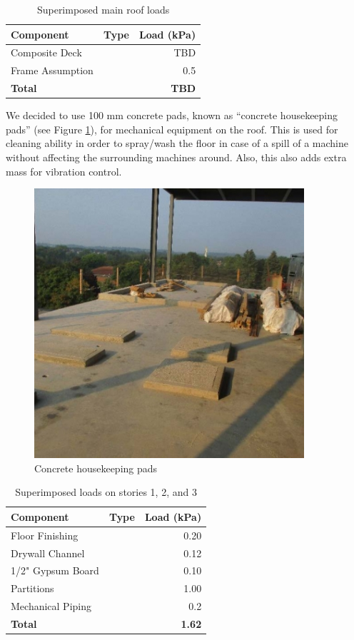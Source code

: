 \documentclass[12pt]{article}
\begin{document}
\begin{table}[h!]
    \centering
    \caption{Superimposed main roof loads}
    \label{tab:selfMain}
    \begin{tabular}{lcr}
        \toprule
        \textbf{Component} & \textbf{Type} & \textbf{Load (kPa)}\\
        \midrule
        Composite Deck &  & TBD\\
        Frame Assumption &  & 0.5\\
        \textbf{Total} & & \textbf{TBD}\\
        \bottomrule
    \end{tabular}
\end{table}

We decided to use 100 mm concrete pads, known as “concrete housekeeping pads” (see Figure \ref{fig:Housekeeping_Pads}), for mechanical equipment on the roof.
This is used for cleaning ability in order to spray/wash the floor in case of a spill of a machine without affecting the surrounding machines around.
Also, this also adds extra mass for vibration control.

\begin{figure}
    \centering
\includegraphics[width=10cm]{Assets/Housekeeping_Pads.png}
\caption{Concrete housekeeping pads}
\label{fig:Housekeeping_Pads}
\end{figure}

\begin{table}[h!]
    \centering
    \caption{Superimposed loads on stories 1, 2, and 3}
    \label{tab:super123}
    \begin{tabular}{lcr}
        \toprule
        \textbf{Component} & \textbf{Type} & \textbf{Load (kPa)}\\
        \midrule
        Floor Finishing &  & 0.20\\
        Drywall Channel &  & 0.12\\
        1/2" Gypsum Board &  & 0.10\\
        Partitions &  & 1.00\\
        Mechanical Piping &  & 0.2\\
        \textbf{Total} & & \textbf{1.62}\\
        \bottomrule
    \end{tabular}
\end{table}
\end{document}
